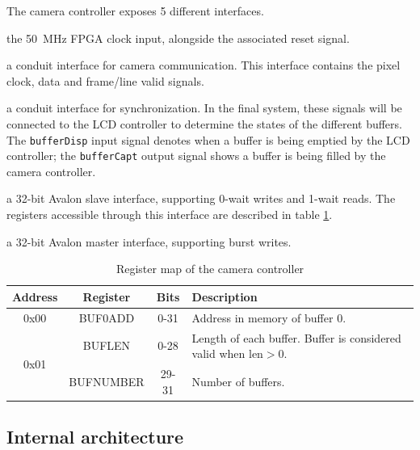 \documentclass[12pt,a4paper]{article}
\begin{document}
The camera controller exposes 5 different interfaces.
\begin{description}[nosep]
	\item[In black:] the \SI{50}{\mega\hertz} FPGA clock input, alongside the associated reset signal.
	\item[In yellow:] a conduit interface for camera communication. This interface contains the pixel clock, data and frame/line valid signals.
	\item[In purple:] a conduit interface for synchronization. In the final system, these signals will be connected to the LCD controller to determine the states of the different buffers. The \texttt{bufferDisp} input signal denotes when a buffer is being emptied by the LCD controller; the \texttt{bufferCapt} output signal shows a buffer is being filled by the camera controller.
	\item[In green:] a 32-bit Avalon slave interface, supporting 0-wait writes and 1-wait reads. The registers accessible through this interface are described in table \ref{tab:map}.
	\item[In red:] a 32-bit Avalon master interface, supporting burst writes.
\end{description}

\begin{table}[ht]
	\centering
	\begin{tabularx}{\linewidth}{|c|c|c|X|}
		\hline
		Address & Register & Bits & Description \\
		\hline
		\hline
		0x00 & BUF0ADD & 0-31 & Address in memory of buffer 0. \\
		\hline
		\multirow{2}{*}{0x01} & BUFLEN & 0-28 & Length of each buffer. Buffer is considered valid when $\text{len} > 0$. \\
		& BUFNUMBER & 29-31 & Number of buffers. \\
		\hline
	\end{tabularx}
	\caption{Register map of the camera controller}
	\label{tab:map}
\end{table}

\subsection{Internal architecture}
\end{document}
